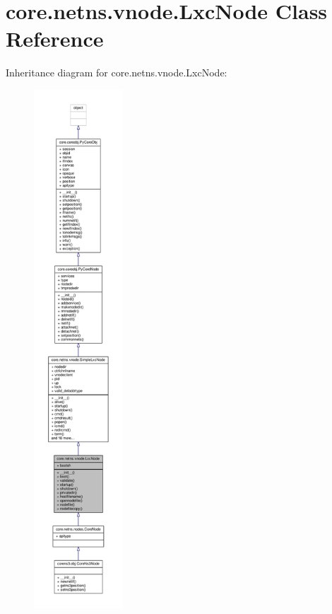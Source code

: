 \hypertarget{classcore_1_1netns_1_1vnode_1_1_lxc_node}{\section{core.\+netns.\+vnode.\+Lxc\+Node Class Reference}
\label{classcore_1_1netns_1_1vnode_1_1_lxc_node}
}


Inheritance diagram for core.\+netns.\+vnode.\+Lxc\+Node\+:
\nopagebreak
\begin{figure}[H]
\begin{center}
\leavevmode
\includegraphics[height=550pt]{classcore_1_1netns_1_1vnode_1_1_lxc_node__inherit__graph}
\end{center}
\end{figure}


